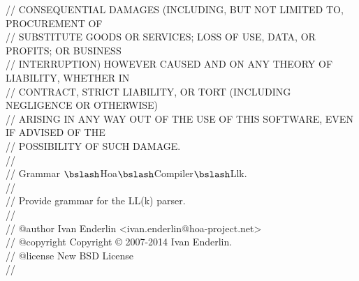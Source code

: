 \begin{bigbigpre}
// CONSEQUENTIAL DAMAGES (INCLUDING, BUT NOT LIMITED TO, PROCUREMENT OF \\
// SUBSTITUTE GOODS OR SERVICES; LOSS OF USE, DATA, OR PROFITS; OR BUSINESS \\
// INTERRUPTION) HOWEVER CAUSED AND ON ANY THEORY OF LIABILITY, WHETHER IN \\
// CONTRACT, STRICT LIABILITY, OR TORT (INCLUDING NEGLIGENCE OR OTHERWISE) \\
// ARISING IN ANY WAY OUT OF THE USE OF THIS SOFTWARE, EVEN IF ADVISED OF THE \\
// POSSIBILITY OF SUCH DAMAGE. \\
// \\
// Grammar \(\bslash\)Hoa\(\bslash\)Compiler\(\bslash\)Llk. \\
// \\
// Provide grammar for the LL(k) parser. \\
// \\
// @author     Ivan Enderlin <ivan.enderlin@hoa-project.net> \\
// @copyright  Copyright © 2007-2014 Ivan Enderlin. \\
// @license    New BSD License \\
// \\
 \\
 \\
 \\
 \\
 \\

\end{bigbigpre}
